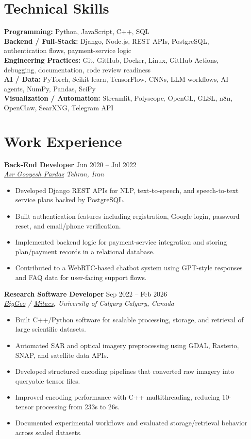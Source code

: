 \documentclass[a4paper,10pt]{article}
\newcommand{\resumeSubheading}[4]{
    \textbf{#1} \hfill #2 \\
    \textit{#3} \hfill \textit{#4}
}
\begin{document}
\section*{Technical Skills}

\textbf{Programming:} Python, JavaScript, C++, SQL \\
\textbf{Backend / Full-Stack:} Django, Node.js, REST APIs, PostgreSQL, authentication flows, payment-service logic \\
\textbf{Engineering Practices:} Git, GitHub, Docker, Linux, GitHub Actions, debugging, documentation, code review readiness \\
\textbf{AI / Data:} PyTorch, Scikit-learn, TensorFlow, CNNs, LLM workflows, AI agents, NumPy, Pandas, SciPy \\
\textbf{Visualization / Automation:} Streamlit, Polyscope, OpenGL, GLSL, n8n, OpenClaw, SearXNG, Telegram API


\section*{Work Experience}

\resumeSubheading
{Back-End Developer}
{Jun 2020 -- Jul 2022}
{\href{https://asr-gooyesh.com/en/}{Asr Gooyesh Pardaz}}
{Tehran, Iran}
\begin{itemize}[leftmargin=0.25in]
    \item Developed Django REST APIs for NLP, text-to-speech, and speech-to-text service plans backed by PostgreSQL.
    \item Built authentication features including registration, Google login, password reset, and email/phone verification.
    \item Implemented backend logic for payment-service integration and storing plan/payment records in a relational database.
    \item Contributed to a WebRTC-based chatbot system using GPT-style responses and FAQ data for user-facing support flows.
\end{itemize}

\resumeSubheading
{Research Software Developer}
{Sep 2022 -- Feb 2026}
{\href{https://biggeo.com}{BigGeo} / \href{https://www.mitacs.ca/}{Mitacs}, University of Calgary}
{Calgary, Canada}
\begin{itemize}[leftmargin=0.25in]
    \item Built C++/Python software for scalable processing, storage, and retrieval of large scientific datasets.
    \item Automated SAR and optical imagery preprocessing using GDAL, Rasterio, SNAP, and satellite data APIs.
    \item Developed structured encoding pipelines that converted raw imagery into queryable tensor files.
    \item Improved encoding performance with C++ multithreading, reducing 10-tensor processing from 233s to 26s.
    \item Documented experimental workflows and evaluated storage/retrieval behavior across scaled datasets.
\end{itemize}
\end{document}
